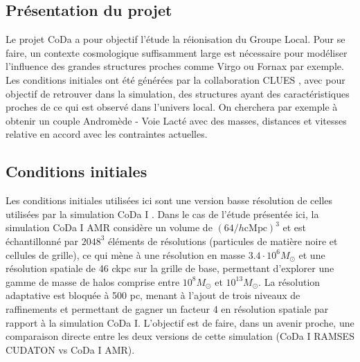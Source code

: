 \subsection{Présentation du projet}

Le projet \ac{CoDa} a pour objectif l’étude la réionisation du Groupe Local. %
Pour se faire, un contexte cosmologique suffisamment large est nécessaire pour modéliser l'influence des grandes structures proches comme Virgo ou Fornax par exemple.
Les conditions initiales ont été générées par la collaboration \ac{CLUES} \citep{2010arXiv1005.2687G}, avec pour objectif de retrouver dans la simulation, des structures ayant des caractéristiques proches de ce qui est observé dans l'univers local.
On cherchera par exemple à obtenir un couple Andromède - Voie Lacté avec des masses, distances et vitesses relative en accord avec les contraintes actuelles.

\subsection{Conditions initiales}
\label{sec:ICCODA}
Les conditions initiales utilisées ici sont une version basse résolution de celles utilisées par la simulation \ac{CoDa} I \citep{ocvirk_cosmic_2015}.
Dans le cas de l'étude présentée ici, la simulation \ac{CoDa} I AMR considère un volume de $\left( 64/h \mathrm{cMpc} \right)^3$ et est échantillonné par $2048^3$ éléments de résolutions (particules de matière noire et cellules de grille), ce qui mène à une résolution en masse $3.4 \cdot 10^6 M_\odot$ et une résolution spatiale de 46 ckpc sur la grille de base, permettant d'explorer une gamme de masse de halos comprise entre $10^8 M_\odot$ et $10^{13}M_\odot$.
La résolution adaptative est bloquée à 500 pc, menant à l'ajout de trois niveaux de raffinements et permettant de gagner un facteur 4 en résolution spatiale par rapport à la simulation  \ac{CoDa} I.
L'objectif est de faire, dans un avenir proche, une comparaison directe entre les deux versions de cette simulation (CoDa I RAMSES CUDATON vs CoDa I AMR).

